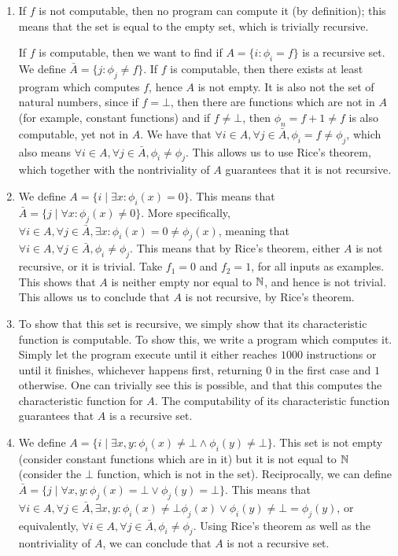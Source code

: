\begin{solution}
\begin{enumerate}
	\item If \(f\) is not computable,
	then no program can compute it (by definition);
	this means that the set is equal to the empty set,
	which is trivially recursive.

	If \(f\) is computable,
	then we want to find if
	\(A = \{i : \phi_i = f\}\)
	is a recursive set.
	We define \(\bar{A} = \{j : \phi_j \ne f\}\).
	If \(f\) is computable, then there exists
	at least program which computes \(f\),
	hence \(A\) is not empty.
	It is also not the set of natural numbers,
	since if \(f = \bot\), then there are functions which are not in \(A\)
	(for example, constant functions)
	and if \(f \ne \bot\), then \(\phi_n = f+1 \ne f\)
	is also computable, yet not in \(A\).
	We have that
	\(\forall i \in A, \forall j \in \bar{A}, \phi_i = f \ne \phi_j\),
	which also means
	\(\forall i \in A, \forall j \in \bar{A}, \phi_i \ne \phi_j\).
	This allows us to use Rice's theorem,
	which together with the nontriviality of \(A\)
	guarantees that it is not recursive.
	\item We define \(A = \{i \mid \exists x : \phi_i(x) = 0\}\).
	This means that \(\bar{A} = \{j \mid \forall x : \phi_j(x) \ne 0\}\).
	More specifically,
	\(\forall i \in A, \forall j \in \bar{A}, \exists x:
	\phi_i(x) = 0 \ne \phi_j(x)\),
	meaning that
	\(\forall i \in A, \forall j \in \bar{A}, \phi_i \ne \phi_j\).
	This means that by Rice's theorem,
	either \(A\) is not recursive, or it is trivial.
	Take \(f_1 = 0\) and \(f_2 = 1\), for all inputs as examples.
	This shows that \(A\) is neither empty nor equal to \(\mathbb{N}\),
	and hence is not trivial.
	This allows us to conclude that \(A\) is not recursive,
	by Rice's theorem.
	\item To show that this set is recursive,
	we simply show that its characteristic function is computable.
	To show this, we write a program which computes it.
	Simply let the program execute until it
	either reaches \(1000\) instructions
	or until it finishes, whichever happens first,
	returning \(0\) in the first case and \(1\) otherwise.
	One can trivially see this is possible,
	and that this computes the characteristic function for \(A\).
	The computability of its characteristic function guarantees
	that \(A\) is a recursive set.
	\item We define \(A = \{i \mid \exists x, y:
	\phi_i(x) \ne \bot \land \phi_i(y) \ne \bot\}\).
	This set is not empty (consider constant functions which are in it)
	but it is not equal to \(\mathbb{N}\) (consider the \(\bot\) function,
	which is not in the set).
	Reciprocally, we can define \(\bar{A} = \{j \mid \forall x, y:
	\phi_j(x) = \bot \lor \phi_j(y) = \bot\}\).
	This means that \(\forall i \in A, \forall j \in \bar{A}, \exists x, y:
	\phi_i(x) \ne \bot \phi_j(x) \lor \phi_i(y) \ne \bot = \phi_j(y)\),
	or equivalently,
	\(\forall i \in A, \forall j \in \bar{A}, \phi_i \ne \phi_j\).
	Using Rice's theorem as well as the nontriviality of \(A\),
	we can conclude that \(A\) is not a recursive set.
\end{enumerate}
\end{solution}

